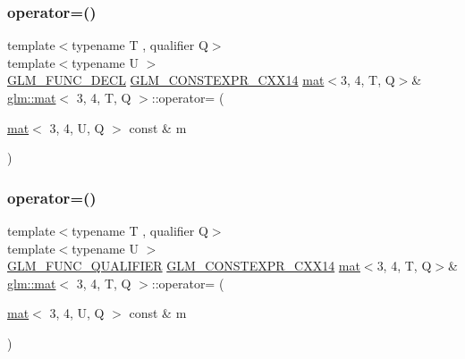 \mbox{\label{structglm_1_1mat_3_013_00_014_00_01_t_00_01_q_01_4_a78ce17c72bd4bffddaaef8c5e7f8348a}} 
\subsubsection{\texorpdfstring{operator=()}{operator=()}\hspace{0.1cm}{\footnotesize\ttfamily [2/3]}}
{\footnotesize\ttfamily template$<$typename T , qualifier Q$>$ \\
template$<$typename U $>$ \\
\mbox{\hyperlink{setup_8hpp_ab2d052de21a70539923e9bcbf6e83a51}{G\+L\+M\+\_\+\+F\+U\+N\+C\+\_\+\+D\+E\+CL}} \mbox{\hyperlink{setup_8hpp_a4dd12abf5e1164bc57f3a34671d03844}{G\+L\+M\+\_\+\+C\+O\+N\+S\+T\+E\+X\+P\+R\+\_\+\+C\+X\+X14}} \mbox{\hyperlink{structglm_1_1mat}{mat}}$<$3, 4, T, Q$>$\& \mbox{\hyperlink{structglm_1_1mat}{glm\+::mat}}$<$ 3, 4, T, Q $>$\+::operator= (\begin{DoxyParamCaption}\item[{\mbox{\hyperlink{structglm_1_1mat}{mat}}$<$ 3, 4, U, Q $>$ const \&}]{m }\end{DoxyParamCaption})}

\mbox{\label{structglm_1_1mat_3_013_00_014_00_01_t_00_01_q_01_4_aac8347d8c60d7b5eac67387ca84f39f6}} 
\subsubsection{\texorpdfstring{operator=()}{operator=()}\hspace{0.1cm}{\footnotesize\ttfamily [3/3]}}
{\footnotesize\ttfamily template$<$typename T , qualifier Q$>$ \\
template$<$typename U $>$ \\
\mbox{\hyperlink{setup_8hpp_a33fdea6f91c5f834105f7415e2a64407}{G\+L\+M\+\_\+\+F\+U\+N\+C\+\_\+\+Q\+U\+A\+L\+I\+F\+I\+ER}} \mbox{\hyperlink{setup_8hpp_a4dd12abf5e1164bc57f3a34671d03844}{G\+L\+M\+\_\+\+C\+O\+N\+S\+T\+E\+X\+P\+R\+\_\+\+C\+X\+X14}} \mbox{\hyperlink{structglm_1_1mat}{mat}}$<$3, 4, T, Q$>$\& \mbox{\hyperlink{structglm_1_1mat}{glm\+::mat}}$<$ 3, 4, T, Q $>$\+::operator= (\begin{DoxyParamCaption}\item[{\mbox{\hyperlink{structglm_1_1mat}{mat}}$<$ 3, 4, U, Q $>$ const \&}]{m }\end{DoxyParamCaption})}



